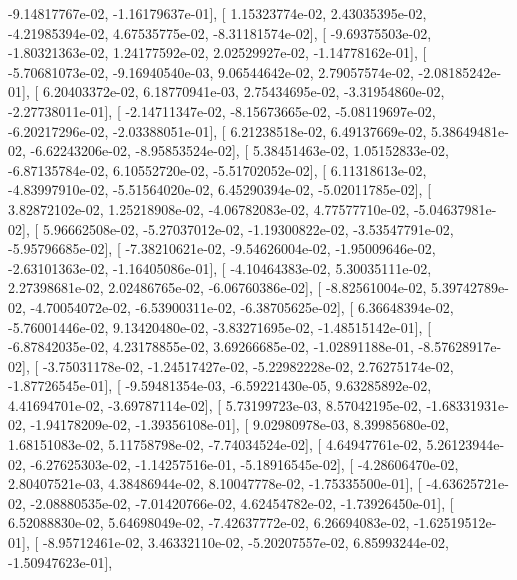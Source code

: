\documentclass{article}
\begin{document}
         -9.14817767e-02,  -1.16179637e-01],
       [  1.15323774e-02,   2.43035395e-02,  -4.21985394e-02,
          4.67535775e-02,  -8.31181574e-02],
       [ -9.69375503e-02,  -1.80321363e-02,   1.24177592e-02,
          2.02529927e-02,  -1.14778162e-01],
       [ -5.70681073e-02,  -9.16940540e-03,   9.06544642e-02,
          2.79057574e-02,  -2.08185242e-01],
       [  6.20403372e-02,   6.18770941e-03,   2.75434695e-02,
         -3.31954860e-02,  -2.27738011e-01],
       [ -2.14711347e-02,  -8.15673665e-02,  -5.08119697e-02,
         -6.20217296e-02,  -2.03388051e-01],
       [  6.21238518e-02,   6.49137669e-02,   5.38649481e-02,
         -6.62243206e-02,  -8.95853524e-02],
       [  5.38451463e-02,   1.05152833e-02,  -6.87135784e-02,
          6.10552720e-02,  -5.51702052e-02],
       [  6.11318613e-02,  -4.83997910e-02,  -5.51564020e-02,
          6.45290394e-02,  -5.02011785e-02],
       [  3.82872102e-02,   1.25218908e-02,  -4.06782083e-02,
          4.77577710e-02,  -5.04637981e-02],
       [  5.96662508e-02,  -5.27037012e-02,  -1.19300822e-02,
         -3.53547791e-02,  -5.95796685e-02],
       [ -7.38210621e-02,  -9.54626004e-02,  -1.95009646e-02,
         -2.63101363e-02,  -1.16405086e-01],
       [ -4.10464383e-02,   5.30035111e-02,   2.27398681e-02,
          2.02486765e-02,  -6.06760386e-02],
       [ -8.82561004e-02,   5.39742789e-02,  -4.70054072e-02,
         -6.53900311e-02,  -6.38705625e-02],
       [  6.36648394e-02,  -5.76001446e-02,   9.13420480e-02,
         -3.83271695e-02,  -1.48515142e-01],
       [ -6.87842035e-02,   4.23178855e-02,   3.69266685e-02,
         -1.02891188e-01,  -8.57628917e-02],
       [ -3.75031178e-02,  -1.24517427e-02,  -5.22982228e-02,
          2.76275174e-02,  -1.87726545e-01],
       [ -9.59481354e-03,  -6.59221430e-05,   9.63285892e-02,
          4.41694701e-02,  -3.69787114e-02],
       [  5.73199723e-03,   8.57042195e-02,  -1.68331931e-02,
         -1.94178209e-02,  -1.39356108e-01],
       [  9.02980978e-03,   8.39985680e-02,   1.68151083e-02,
          5.11758798e-02,  -7.74034524e-02],
       [  4.64947761e-02,   5.26123944e-02,  -6.27625303e-02,
         -1.14257516e-01,  -5.18916545e-02],
       [ -4.28606470e-02,   2.80407521e-03,   4.38486944e-02,
          8.10047778e-02,  -1.75335500e-01],
       [ -4.63625721e-02,  -2.08880535e-02,  -7.01420766e-02,
          4.62454782e-02,  -1.73926450e-01],
       [  6.52088830e-02,   5.64698049e-02,  -7.42637772e-02,
          6.26694083e-02,  -1.62519512e-01],
       [ -8.95712461e-02,   3.46332110e-02,  -5.20207557e-02,
          6.85993244e-02,  -1.50947623e-01],
\end{document}
